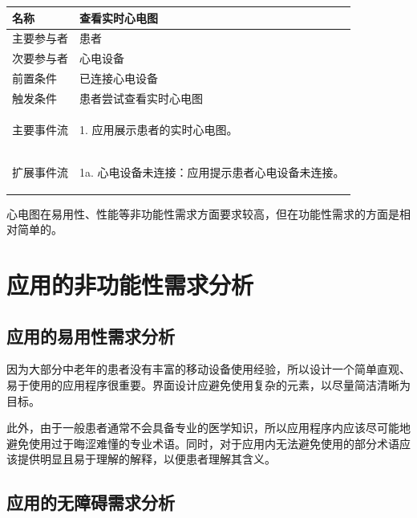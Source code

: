 \begin{table}[!ht]
    \label{tab:uc-real-time-ecg}
    \begin{tabularx}{\textwidth}{|l|X|}
        \hline
        名称    & 查看实时心电图     \\
        \hline
        主要参与者 & 患者          \\
        \hline
        次要参与者 & 心电设备        \\
        \hline
        前置条件  & 已连接心电设备     \\
        \hline
        触发条件  & 患者尝试查看实时心电图 \\
        \hline
        主要事件流 &
        \begin{itemizec}
            \item[1.] 应用展示患者的实时心电图。
        \end{itemizec} \\
        \hline
        扩展事件流 &
        \begin{itemizec}
            \item[1a.] 心电设备未连接：应用提示患者心电设备未连接。
        \end{itemizec} \\
        \hline
    \end{tabularx}
\end{table}

心电图在易用性、性能等非功能性需求方面要求较高，但在功能性需求的方面是相对简单的。


\section{应用的非功能性需求分析}\label{sec:nonfunc-req}

\subsection{应用的易用性需求分析}\label{subsec:usability}

因为大部分中老年的患者没有丰富的移动设备使用经验，所以设计一个简单直观、易于使用的应用程序很重要。界面设计应避免使用复杂的元素，以尽量简洁清晰为目标。

此外，由于一般患者通常不会具备专业的医学知识，所以应用程序内应该尽可能地避免使用过于晦涩难懂的专业术语。同时，对于应用内无法避免使用的部分术语应该提供明显且易于理解的解释，以便患者理解其含义。

\subsection{应用的无障碍需求分析}\label{subsec:accessibility}

